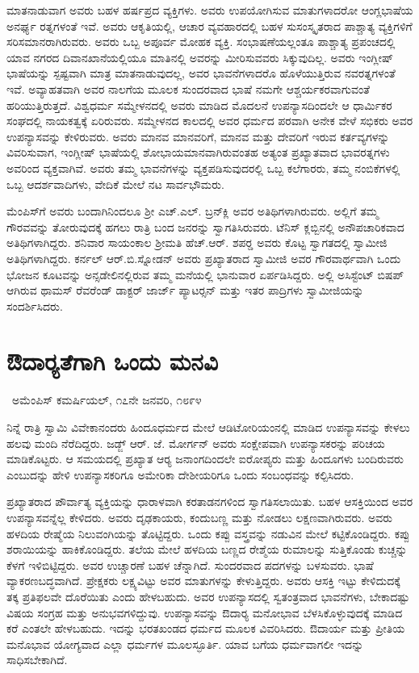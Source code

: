  ಮಾತನಾಡುವಾಗ ಅವರು ಬಹಳ ಹರ್ಷಪ್ರದ ವ್ಯಕ್ತಿಗಳು. ಅವರು ಉಪಯೋಗಿಸುವ ಮಾತುಗಳಾದರೋ ಆಂಗ್ಲಭಾಷೆಯ ಅನರ್ಘ್ಯ ರತ್ನಗಳಂತೆ ಇವೆ. ಅವರು ಆಕೃತಿಯಲ್ಲಿ, ಆಚಾರ ವ್ಯವಹಾರದಲ್ಲಿ ಬಹಳ ಸುಸಂಸ್ಕೃತರಾದ ಪಾಶ್ಚಾತ್ಯ ವ್ಯಕ್ತಿಗಳಿಗೆ ಸರಿಸಮಾನರಾಗಿರುವರು. ಅವರು ಒಬ್ಬ ಅಪೂರ್ವ ಮೋಹಕ ವ್ಯಕ್ತಿ. ಸಂಭಾಷಣೆಯಲ್ಲಂತೂ ಪಾಶ್ಚಾತ್ಯ ಪ್ರಪಂಚದಲ್ಲಿ ಯಾವ ನಗರದ ದಿವಾನಖಾನೆಯಲ್ಲಿಯೂ ಮಾತಿನಲ್ಲಿ ಅವರನ್ನು ಮೀರಿಸುವವರು ಸಿಕ್ಕುವುದಿಲ್ಲ. ಅವರು ಇಂಗ್ಲೀಷ್ ಭಾಷೆಯನ್ನು ಸ್ಪಷ್ಟವಾಗಿ ಮಾತ್ರ ಮಾತನಾಡುವುದಲ್ಲ, ಅವರ ಭಾವನೆಗಳಾದರೊ ಹೊಳೆಯುತ್ತಿರುವ ನವರತ್ನಗಳಂತೆ ಇವೆ. ಅವ್ಯಾಹತವಾಗಿ ಅವರ ನಾಲಗೆಯ ಮೂಲಕ ಸುಂದರವಾದ ಭಾಷೆ ನಮಗೇ ಆಶ್ಚರ್ಯಕರವಾಗುವಂತೆ ಹರಿಯುತ್ತಿರುತ್ತದೆ. ವಿಶ್ವಧರ್ಮ ಸಮ್ಮೇಳನದಲ್ಲಿ ಅವರು ಮಾಡಿದ ಮೊದಲನೆ ಉಪನ್ಯಾಸದಿಂದಲೇ ಆ ಧಾರ್ಮಿಕರ ಸಂಘದಲ್ಲಿ ನಾಯಕತ್ವಕ್ಕೆ ಏರಿರುವರು. ಸಮ್ಮೇಳನದ ಕಾಲದಲ್ಲಿ ಅವರ ಧರ್ಮದ ಪರವಾಗಿ ಅನೇಕ ವೇಳೆ ಸಭಿಕರು ಅವರ ಉಪನ್ಯಾಸವನ್ನು ಕೇಳಿರುವರು. ಅವರು ಮಾನವ ಮಾನವರಿಗೆ, ಮಾನವ ಮತ್ತು ದೇವರಿಗೆ ಇರುವ ಕರ್ತವ್ಯಗಳನ್ನು ವಿವರಿಸುವಾಗ, ಇಂಗ್ಲೀಷ್ ಭಾಷೆಯಲ್ಲಿ ಶೋಭಾಯಮಾನವಾಗಿರುವಂತಹ ಅತ್ಯಂತ ಪ್ರಖ್ಯಾತವಾದ ಭಾವರತ್ನಗಳು ಅವರಿಂದ ವ್ಯಕ್ತವಾಗಿವೆ. ಅವರು ತಮ್ಮ ಭಾವನೆಗಳನ್ನು ವ್ಯಕ್ತಪಡಿಸುವುದರಲ್ಲಿ ಒಬ್ಬ ಕಲೆಗಾರರು, ತಮ್ಮ ನಂಬಿಕೆಗಳಲ್ಲಿ ಒಬ್ಬ ಆದರ್ಶವಾದಿಗಳು, ವೇದಿಕೆ ಮೇಲೆ ನಟ ಸಾರ್ವಭೌಮರು. 

 ಮೆಂಪಿಸ್‍ಗೆ ಅವರು ಬಂದಾಗಿನಿಂದಲೂ ಶ‍್ರೀ ಎಚ್.ಎಲ್. ಬ್ರನ್‍ಕ್ಲಿ ಅವರ ಅತಿಥಿಗಳಾಗಿರುವರು. ಅಲ್ಲಿಗೆ ತಮ್ಮ ಗೌರವವನ್ನು ತೋರುವುದಕ್ಕೆ ಹಗಲು ರಾತ್ರಿ ಬಂದ ಜನರನ್ನು ಸ್ವಾಗತಿಸಿರುವರು. ಟೆನಿಸ್ ಕ್ಲಬ್ಬಿನಲ್ಲಿ ಅನೌಪಚಾರಿಕವಾದ ಅತಿಥಿಗಳಾಗಿದ್ದರು. ಶನಿವಾರ ಸಾಯಂಕಾಲ ಶ‍್ರೀಮತಿ ಹೆಚ್.ಆರ್. ಶಪರ‍್ಡ ಅವರು ಕೊಟ್ಟ ಸ್ವಾಗತದಲ್ಲಿ ಸ್ವಾಮೀಜಿ ಅತಿಥಿಗಳಾಗಿದ್ದರು. ಕರ್ನಲ್ ಆರ್.ಬಿ.ಸ್ನೋಡನ್ ಅವರು ಪ್ರಖ್ಯಾತರಾದ ಸ್ವಾಮೀಜಿ ಅವರ ಗೌರವಾರ್ಥವಾಗಿ ಒಂದು ಭೋಜನ ಕೂಟವನ್ನು ಅನ್ಸ‍ಡೇಲಿನಲ್ಲಿರುವ ತಮ್ಮ ಮನೆಯಲ್ಲಿ ಭಾನುವಾರ ಏರ್ಪಡಿಸಿದ್ದರು. ಅಲ್ಲಿ ಅಸಿಸ್ಟೆಂಟ್ ಬಿಷಪ್ ಆಗಿರುವ ಥಾಮಸ್ ರೆವರೆಂಡ್ ಡಾಕ್ಟರ್ ಜಾರ್ಜ್ ಪ್ಯಾಟರ್‍ಸನ್ ಮತ್ತು ಇತರ ಪಾದ್ರಿಗಳು ಸ್ವಾಮೀಜಿಯನ್ನು ಸಂದರ್ಶಿಸಿದರು.


\section*{ಔದಾರ‍್ಯತೆಗಾಗಿ ಒಂದು ಮನವಿ}

~\hfill{\fontsize{11pt}{13.75pt}\selectfont ಅಮೆಂಪಿಸ್ ಕಮರ್ಷಿಯಲ್, ೧೭ನೇ ಜನವರಿ, ೧೮೯೪ }

 ನಿನ್ನೆ ರಾತ್ರಿ ಸ್ವಾಮಿ ವಿವೇಕಾನಂದರು ಹಿಂದೂಧರ್ಮದ ಮೇಲೆ ಆಡಿಟೋರಿಯಂನಲ್ಲಿ ಮಾಡಿದ ಉಪನ್ಯಾಸವನ್ನು ಕೇಳಲು ಹಲವು ಮಂದಿ ನೆರೆದಿದ್ದರು. ಜಡ್ಜ್ ಆರ್. ಜೆ. ಮೋರ್ಗನ್ ಅವರು ಸಂಕ್ಷೇಪವಾಗಿ ಉಪನ್ಯಾಸಕರನ್ನು ಪರಿಚಯ ಮಾಡಿಕೊಟ್ಟರು. ಆ ಸಮಯದಲ್ಲಿ ಪ್ರಖ್ಯಾತ ಆರ‍್ಯ ಜನಾಂಗದಿಂದಲೇ ಐರೋಪ್ಯರು ಮತ್ತು ಹಿಂದೂಗಳು ಬಂದಿರುವರು ಎಂಬುದನ್ನು ಹೇಳಿ ಉಪನ್ಯಾಸಕರಿಗೂ ಅಮೇರಿಕಾ ದೇಶೀಯರಿಗೂ ಒಂದು ಸಂಬಂಧವನ್ನು ಕಲ್ಪಿಸಿದರು. 

 ಪ್ರಖ್ಯಾತರಾದ ಪೌರ್ವಾತ್ಯ ವ್ಯಕ್ತಿಯನ್ನು ಧಾರಾಳವಾಗಿ ಕರತಾಡನಗಳಿಂದ ಸ್ವಾಗತಿಸಲಾಯಿತು. ಬಹಳ ಆಸಕ್ತಿಯಿಂದ ಅವರ ಉಪನ್ಯಾಸವನ್ನೆಲ್ಲ ಕೇಳಿದರು. ಅವರು ದೃಢಕಾಯರು, ಕಂದುಬಣ್ಣ ಮತ್ತು ನೋಡಲು ಲಕ್ಷಣವಾಗಿರುವರು. ಅವರು ಹಳದಿಯ ರೇಷ್ಮೆಯ ನಿಲುವಂಗಿಯನ್ನು ತೊಟ್ಟಿದ್ದರು. ಒಂದು ಕಪ್ಪು ವಸ್ತ್ರವನ್ನು ನಡುವಿನ ಮೇಲೆ ಕಟ್ಟಿಕೊಂಡಿದ್ದರು. ಕಪ್ಪು ಶರಾಯಿಯನ್ನು ಹಾಕಿಕೊಂಡಿದ್ದರು. ತಲೆಯ ಮೇಲೆ ಹಳದಿಯ ಬಣ್ಣದ ರೇಶ್ಮೆಯ ರುಮಾಲನ್ನು ಸುತ್ತಿಕೊಂಡು ಕುಚ್ಚನ್ನು ಕೆಳಗೆ ಇಳಿಬಿಟ್ಟಿದ್ದರು. ಅವರ ಉಚ್ಚಾರಣೆ ಬಹಳ ಚೆನ್ನಾಗಿದೆ. ಸುಂದರವಾದ ಪದಗಳನ್ನು ಬಳಸುವರು. ಭಾಷೆ ವ್ಯಾಕರಣಬದ್ಧವಾಗಿದೆ. ಪ್ರೇಕ್ಷಕರು ಲಕ್ಷ್ಯವಿಟ್ಟು ಅವರ ಮಾತುಗಳನ್ನು ಕೇಳುತ್ತಿದ್ದರು. ಅವರು ಆಸಕ್ತಿ ಇಟ್ಟು ಕೇಳಿದುದಕ್ಕೆ ತಕ್ಕ ಪ್ರತಿಫಲವೇ ದೊರೆಯಿತು ಎಂದು ಹೇಳಬಹುದು. ಅವರ ಉಪನ್ಯಾಸದಲ್ಲಿ ಸ್ವತಂತ್ರವಾದ ಭಾವನೆಗಳು, ಬೇಕಾದಷ್ಟು ವಿಷಯ ಸಂಗ್ರಹ ಮತ್ತು ಅನುಭವಗಳಿದ್ದುವು. ಉಪನ್ಯಾಸವನ್ನು ಔದಾರ‍್ಯ ಮನೋಭಾವ ಬೆಳಸಿಕೊಳ್ಳುವುದಕ್ಕೆ ಮಾಡಿದ ಕರೆ ಎಂತಲೇ ಹೇಳಬಹುದು. ಇದನ್ನು ಭರತಖಂಡದ ಧರ್ಮದ ಮೂಲಕ ವಿವರಿಸಿದರು. ಔದಾರ್ಯ ಮತ್ತು ಪ್ರೀತಿಯ ಮನೊಭಾವ ಯೋಗ್ಯವಾದ ಎಲ್ಲಾ ಧರ್ಮಗಳ ಮೂಲಸ್ಫೂರ್ತಿ. ಯಾವ ಬಗೆಯ ಧರ್ಮವಾಗಲೀ ಇದನ್ನು ಸಾಧಿಸಬೇಕಾಗಿದೆ. 

